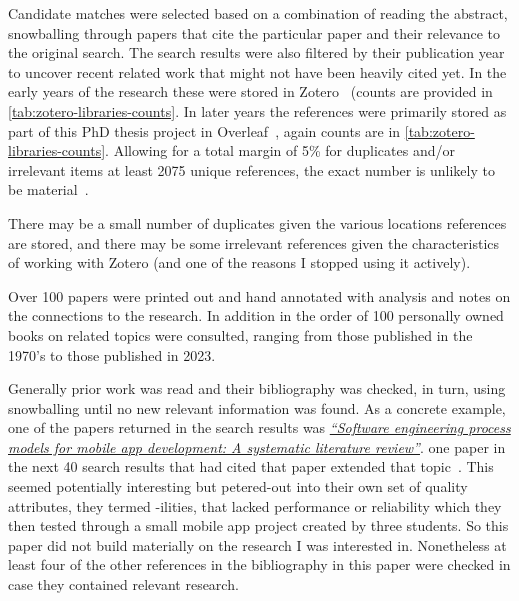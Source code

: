 Candidate matches were selected based on a combination of reading the abstract, snowballing through papers that cite the particular paper and their relevance to the original search. The search results were also filtered by their publication year to uncover recent related work that might not have been heavily cited yet. In the early years of the research these were stored in Zotero~ (counts are provided in \ref{tab:zotero-libraries-counts}. In later years the references were primarily stored as part of this PhD thesis project in Overleaf~, again counts are in \ref{tab:zotero-libraries-counts}. Allowing for a total margin of 5\% for duplicates and/or irrelevant items at least 2075 unique references, the exact number is unlikely to be material~.

There may be a small number of duplicates given the various locations references are stored, and there may be some irrelevant references given the characteristics of working with Zotero (and one of the reasons I stopped using it actively).

Over 100 papers were printed out and hand annotated with analysis and notes on the connections to the research. In addition in the order of 100 personally owned books on related topics were consulted, ranging from those published in the 1970's to those published in 2023.

Generally prior work was read and their bibliography was checked, in turn, using snowballing until no new relevant information was found. As a concrete example, one of the papers returned in the search results was \href{https://scholar.google.com/scholar?cites=17913946012612049501&as_sdt=2005&sciodt=0,5&hl=en}{\emph{``Software engineering process models for mobile app development: A systematic literature review''}}. one paper in the next 40 search results that had cited that paper extended that topic~. This seemed potentially interesting but petered-out into their own set of quality attributes, they termed -ilities, that lacked performance or reliability which they then tested through a small mobile app project created by three students. So this paper did not build materially on the research I was interested in. Nonetheless at least four of the other references in the bibliography in this paper were checked in case they contained relevant research. 

